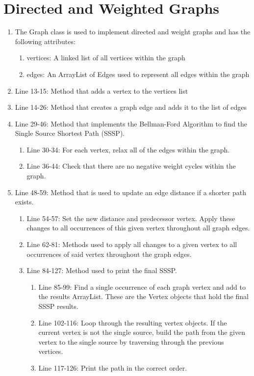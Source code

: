 \documentclass[letterpaper, 10pt,DIV=13]{scrartcl}
\numberwithin{equation}{section} %
\numberwithin{figure}{section} %
\numberwithin{table}{section} %
\begin{document}
\section{Directed and Weighted Graphs}
\begin{enumerate}
    \item The Graph class is used to implement directed and weight graphs and has the following attributes:
    \begin{enumerate}
        \item vertices: A linked list of all vertices within the graph
        \item edges: An ArrayList of Edges used to represent all edges within the graph
    \end{enumerate}
    \item Line 13-15: Method that adds a vertex to the vertices list
    \item Line 14-26: Method that creates a graph edge and adds it to the list of edges
    \item Line 29-46: Method that implements the Bellman-Ford Algorithm to find the Single Source Shortest Path (SSSP).
    \begin{enumerate}
        \item Line 30-34: For each vertex, relax all of the edges within the graph.
        \item Line 36-44: Check that there are no negative weight cycles within the graph.
    \end{enumerate}
    \item Line 48-59: Method that is used to update an edge distance if a shorter path exists.
    \begin{enumerate}
        \item Line 54-57: Set the new distance and predecessor vertex. Apply these changes to all occurrences of this given vertex throughout all graph edges.
        \item Line 62-81: Methods used to apply all changes to a given vertex to all occurrences of said vertex throughout the graph edges.
        \item Line 84-127: Method used to print the final SSSP.
        \begin{enumerate}
            \item Line 85-99: Find a single occurrence of each graph vertex and add to the results ArrayList. These are the Vertex objects that hold the final SSSP results.
            \item Line 102-116: Loop through the resulting vertex objects. If the current vertex is not the single source, build the path from the given vertex to the single source by traversing through the previous vertices.
            \item Line 117-126: Print the path in the correct order.
        \end{enumerate}
    \end{enumerate}
\end{enumerate}
\end{document}
